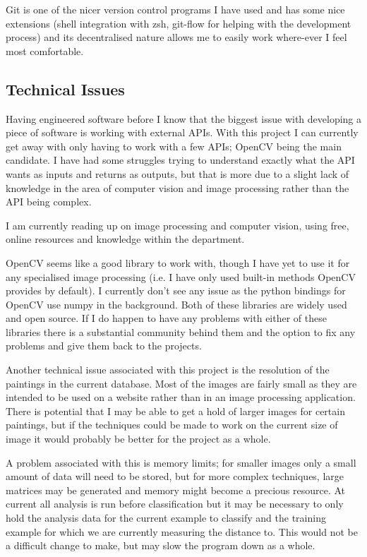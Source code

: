 \documentclass[11pt,fleqn,twoside]{article}
\begin{document}
Git is one of the nicer version control programs I have used and has some nice extensions (shell
integration with zsh, git-flow for helping with the development process) and its decentralised 
nature allows me to easily work where-ever I feel most comfortable.

\subsection{Technical Issues}
Having engineered software before I know that the biggest issue with developing a piece of software
is working with external APIs. With this project I can currently get away with only having to work
with a few APIs; OpenCV being the main candidate. I have had some struggles trying to understand
exactly what the API wants as inputs and returns as outputs, but that is more due to a slight lack
of knowledge in the area of computer vision and image processing rather than the API being complex.

I am currently reading up on image processing and computer vision, using free,
online resources\cite{Prince2012Computer} and knowledge within the department.

OpenCV seems like a good library to work with, though I have yet to use it for any
specialised image processing (i.e. I have only used built-in methods OpenCV provides by default).
I currently don't see any issue as the python bindings for OpenCV use numpy in the background. Both
of these libraries are widely used and open source. If I do happen to have any problems with either
of these libraries there is a substantial community behind them and the option to fix any problems
and give them back to the projects.

Another technical issue associated with this project is the resolution of the paintings in the 
current database. Most of the images are fairly small as they are intended to be used on a website
rather than in an image processing application. There is potential that I may be able to get a hold
of larger images for certain paintings, but if the techniques could be made to work on the current
size of image it would probably be better for the project as a whole.

A problem associated with this is memory limits; for smaller images only a small amount of data
will need to be stored, but for more complex techniques, large matrices may be generated and memory
might become a precious resource. At current all analysis is run before classification but it may
be necessary to only hold the analysis data for the current example to classify and the training 
example for which we are currently measuring the distance to. This would not be a difficult change
to make, but may slow the program down as a whole.
\end{document}
